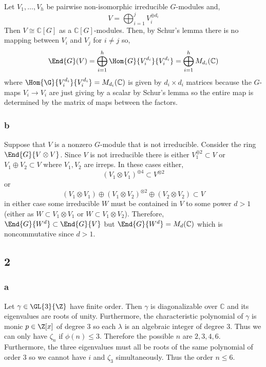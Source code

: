 \documentclass[12pt]{article}
\renewcommand{\C}{\mathbb{C}}
\begin{document}
Let $V_1, \dots, V_h$ be pairwise non-isomorphic irreducible $G$-modules and,
\[ V = \bigoplus_{i = 1}^j V_i^{\oplus d_i} \]
Then $V \cong \C[G]$ as a $\C[G]$-modules. Then, by Schur's lemma there is no mapping between $V_i$ and $V_j$ for $i \neq j$ so,
\[ \End{G}(V) = \bigoplus_{i = 1}^h \Hom{G}{V_i^{d_i}}{V_i^{d_i}} = \bigoplus_{i = 1}^h M_{d_i}(\C) \]
where $\Hom{\G}{V_i^{d_i}}{V_i^{d_i}} = M_{d_i}(\C)$ is given by $d_i \times d_i$ matrices because the $G$-maps $V_i \to V_i$ are just giving by a scalar by Schur's lemma so the entire map is determined by the matrix of maps between the factors.

\subsubsection{b}

Suppose that $V$ is a nonzero $G$-module that is not irreducible. Consider the ring $\End{G}{V \otimes V}$. Since $V$ is not irreducible there is either $V_1^{\oplus 2} \subset V$ or $V_1 \oplus V_2 \subset V$ where $V_1, V_2$ are irreps. In these cases either,
\[ (V_1 \otimes V_1)^{\oplus 4} \subset V^{\otimes 2} \]
or 
\[ (V_1 \otimes V_1) \oplus (V_1 \otimes V_2)^{\otimes 2} \oplus (V_2 \otimes V_2) \subset V \]
in either case some irreducible $W$ must be contained in $V$ to some power $d > 1$ (either as $W \subset V_1 \otimes V_1$ or $W \subset V_1 \otimes V_2$). Therefore, $\End{G}{W^d} \subset \End{G}{V}$ but $\End{G}{W^d} = M_d(\C)$ which is noncommutative since $d > 1$.

\subsection{2}

\subsubsection{a}

Let $\gamma \in \GL{3}{\Z}$ have finite order. Then $\gamma$ is diagonalizable over $\C$ and its eigenvalues are roots of unity. Furthermore, the characteristic polynomial of $\gamma$ is monic $p \in \Z[x]$ of degree $3$ so each $\lambda$ is an algebraic integer of degree $3$. Thus we can only have $\zeta_n$ if $\phi(n) \le 3$. Therefore the possible $n$ are $2,3,4,6$. Furthermore, the three eigenvalues must all be roots of the same polynomial of order $3$ so we cannot have $i$ and $\zeta_3$ simultaneously. Thus the order $n \le 6$.
\end{document}

